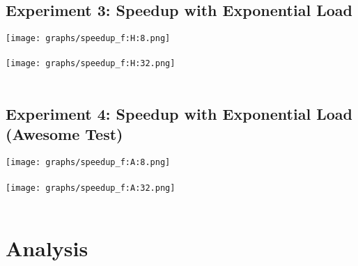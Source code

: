 \documentclass[]{article}
\begin{document}
\subsection{Experiment 3: Speedup with Exponential Load}
\texttt{[image: graphs/speedup\_f:H:8.png]}\\\\
\texttt{[image: graphs/speedup\_f:H:32.png]}\\\\
\subsection{Experiment 4: Speedup with Exponential Load (Awesome Test)}
\texttt{[image: graphs/speedup\_f:A:8.png]}\\\\
\texttt{[image: graphs/speedup\_f:A:32.png]}\\\\

\section{Analysis}
\end{document}
